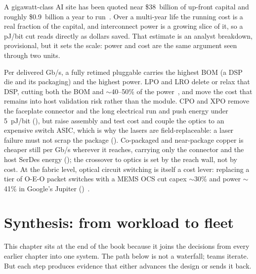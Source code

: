  A gigawatt-class AI site
has been quoted near \$38~billion of up-front capital and roughly \$0.9~billion a
year to run~. Over a multi-year life the running cost is a real
fraction of the capital, and interconnect power is a growing slice of it, so a
pJ/bit cut reads directly as dollars saved. That estimate is an analyst breakdown,
provisional, but it sets the scale: power and cost are the same argument seen
through two units.

 Per delivered
Gb/s, a fully retimed pluggable carries the highest BOM (a DSP die and its
packaging) and the highest power. LPO and LRO delete or relax that DSP, cutting both
the BOM and $\sim$40--50\% of the power~\cite{lpo}, and move the cost that remains
into host validation risk rather than the module. CPO and XPO remove the faceplate
connector and the long electrical run and push energy under 5~pJ/bit
(), but raise assembly and test cost and couple the optics to an
expensive switch ASIC, which is why the lasers are field-replaceable: a laser
failure must not scrap the package (). Co-packaged and
near-package copper is cheaper still per Gb/s wherever it reaches, carrying only the
connector and the host SerDes energy (); the crossover to optics
is set by the reach wall, not by cost. At the fabric level, optical circuit
switching is itself a cost lever: replacing a tier of O-E-O packet switches with a
MEMS OCS cut capex $\sim$30\% and power $\sim$41\% in Google's Jupiter
()~\cite{jupiterocs}.


\section{Synthesis: from workload to fleet}
\label{sec:synthesis}

This chapter sits at the end of the book because it joins the decisions from every
earlier chapter into one system. The path below is not a waterfall; teams iterate.
But each step produces evidence that either advances the design or sends it back.

